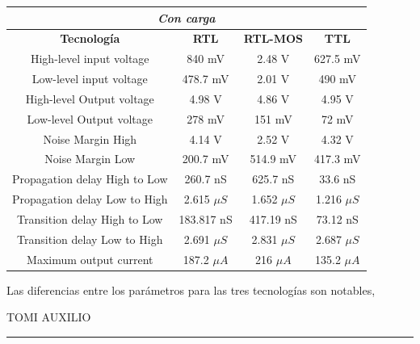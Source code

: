 \begin{table}[H]
\centering
\begin{tabular}{c|ccc}
\hline
\multicolumn{4}{|c|}{\textit{Con carga}}                                                                         \\ \hline
\multicolumn{1}{|c|}{\textbf{Tecnología}} & \textbf{RTL}  & \textbf{RTL-MOS} & \multicolumn{1}{c|}{\textbf{TTL}} \\ \hline
High-level input voltage                  & 840 mV        & 2.48 V           & 627.5 mV                          \\
Low-level input voltage                   & 478.7 mV      & 2.01 V         &    490 mV                         \\
High-level Output voltage                 & 4.98 V        & 4.86 V          & 4.95 V                            \\
Low-level Output voltage                  & 278 mV        & 151 mV           & 72 mV                             \\
Noise Margin High                         & 4.14 V        & 2.52 V           & 4.32 V                            \\
Noise Margin Low                          & 200.7 mV      & 514.9 mV         & 417.3 mV                          \\
Propagation delay High to Low             & 260.7 nS      & 625.7 nS         & 33.6 nS                           \\
Propagation delay Low to High             & 2.615 $\mu S$ & 1.652 $\mu S$    & 1.216 $\mu S$                     \\
Transition delay High to Low              & 183.817 nS    & 417.19 nS        & 73.12 nS                          \\
Transition delay Low to High              & 2.691 $\mu S$ & 2.831 $\mu S$    & 2.687 $\mu S$                     \\
Maximum output current                    &  187.2 $\mu A$             &     216 $\mu A$             &   135.2 $\mu A$                               
\end{tabular}
\end{table}
 

Las diferencias entre los parámetros para las tres tecnologías son notables,
{\begin{center}\color{red} \begin{huge}
TOMI AUXILIO \end{huge} \rule{\linewidth}{0.5mm}\end{center} }

%